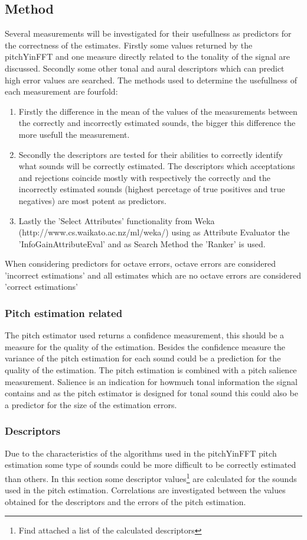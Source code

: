 \documentclass{proc}
\begin{document}
\subsection{Method}
Several measurements will be investigated for their usefullness as predictors for the correctness of the estimates. Firstly some values returned by the pitchYinFFT and one measure directly related to the tonality of the signal are discussed. Secondly some other tonal and aural descriptors which can predict high error values are searched. The methods used to determine the usefullness of each measurement are fourfold:
\begin{enumerate}
    \item Firstly the difference in the mean of the values of the measurements between the correctly and incorrectly estimated sounds, the bigger this difference the more usefull the measurement. 
    \item Secondly the descriptors are tested for their abilities to correctly identify what sounds will be correctly estimated. The descriptors which acceptations and rejections coincide mostly with respectively the correctly and the incorrectly estimated sounds (highest percetage of true positives and true negatives) are most potent as predictors. 
    \item Lastly the 'Select Attributes' functionality from Weka (http://www.cs.waikato.ac.nz/ml/weka/) using as Attribute Evaluator the 'InfoGainAttributeEval' and as Search Method the 'Ranker' is used.
\end{enumerate}
When considering predictors for octave errors, octave errors are considered 'incorrect estimations' and all estimates which are no octave errors are considered 'correct estimations'

\subsubsection{Pitch estimation related}
The pitch estimator used returns a confidence measurement, this should be a measure for the quality of the estimation. Besides the confidence measure the variance of the pitch estimation for each sound could be a prediction for the quality of the estimation. The pitch estimation is combined with a pitch salience measurement. Salience is an indication for howmuch tonal information the signal contains and as the pitch estimator is designed for tonal sound this could also be a predictor for the size of the estimation errors.

\subsubsection{Descriptors}
Due to the characteristics of the algorithms used in the pitchYinFFT pitch estimation some type of sounds could be more difficult to be correctly estimated than others. In this section some descriptor values\footnote{Find attached a list of the calculated descriptors} are calculated for the sounds used in the pitch estimation. Correlations are investigated between the values obtained for the descriptors and the errors of the pitch estimation. 
\end{document}

